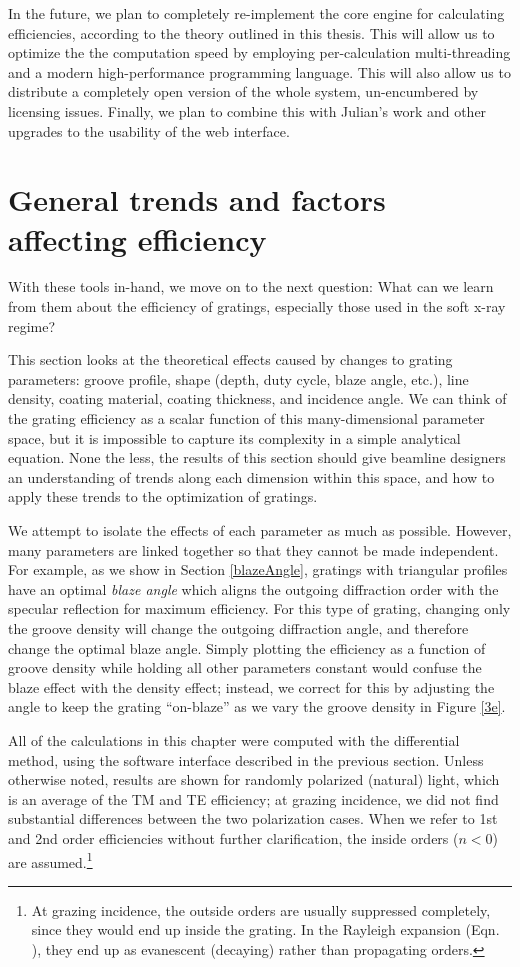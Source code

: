 In the future, we plan to completely re-implement the core engine for calculating efficiencies, according to the theory outlined in this thesis.  This will allow us to optimize the the computation speed by employing per-calculation multi-threading and a modern high-performance programming language.  This will also allow us to distribute a completely open version of the whole system, un-encumbered by licensing issues.  Finally, we plan to combine this with Julian's work and other upgrades to the usability of the web interface.

\section{General trends and factors affecting efficiency}
With these tools in-hand, we move on to the next question: What can we learn from them about the efficiency of gratings, especially those used in the soft x-ray regime?

This section looks at the theoretical effects caused by changes to grating parameters: groove profile, shape (depth, duty cycle, blaze angle, etc.), line density, coating material, coating thickness, and incidence angle.  We can think of the grating efficiency as a scalar function of this many-dimensional parameter space, but it is impossible to capture its complexity in a simple analytical equation.  None the less, the results of this section should give beamline designers an understanding of trends along each dimension within this space, and how to apply these trends to the optimization of gratings.

We attempt to isolate the effects of each parameter as much as possible.  However, many parameters are linked together so that they cannot be made independent.  For example, as we show in Section \ref{blazeAngle}, gratings with triangular profiles have an optimal \emph{blaze angle} which aligns the outgoing diffraction order with the specular reflection for maximum efficiency.  For this type of grating, changing only the groove density will change the outgoing diffraction angle, and therefore change the optimal blaze angle.  Simply plotting the efficiency as a function of groove density while holding all other parameters constant would confuse the blaze effect with the density effect; instead, we correct for this by adjusting the angle to keep the grating ``on-blaze'' as we vary the groove density in Figure \ref{3e}.

All of the calculations in this chapter were computed with the differential method, using the software interface described in the previous section.  Unless otherwise noted, results are shown for randomly polarized (natural) light, which is an average of the TM and TE efficiency; at grazing incidence, we did not find substantial differences between the two polarization cases.  When we refer to 1st and 2nd order efficiencies without further clarification, the inside orders ($n<0$) are assumed.\footnote{At grazing incidence, the outside orders are usually suppressed completely, since they would end up inside the grating. In the Rayleigh expansion (Eqn. ), they end up as evanescent (decaying) rather than propagating orders.}
